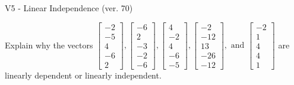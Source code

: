 \begin{exercise}
  \begin{exerciseTitle}V5 - Linear Independence (ver. 70)\end{exerciseTitle}
  \begin{exerciseStatement}
    Explain why the vectors \(\left[\begin{array}{r}
-2 \\
-5 \\
4 \\
-6 \\
2
\end{array}\right] , \left[\begin{array}{r}
-6 \\
2 \\
-3 \\
-2 \\
-6
\end{array}\right] , \left[\begin{array}{r}
4 \\
-2 \\
4 \\
-6 \\
-5
\end{array}\right] , \left[\begin{array}{r}
-2 \\
-12 \\
13 \\
-26 \\
-12
\end{array}\right] , \text{ and } \left[\begin{array}{r}
-2 \\
1 \\
4 \\
4 \\
1
\end{array}\right]\) are linearly dependent or linearly independent.	



\end{exerciseStatement}
\end{exercise}

